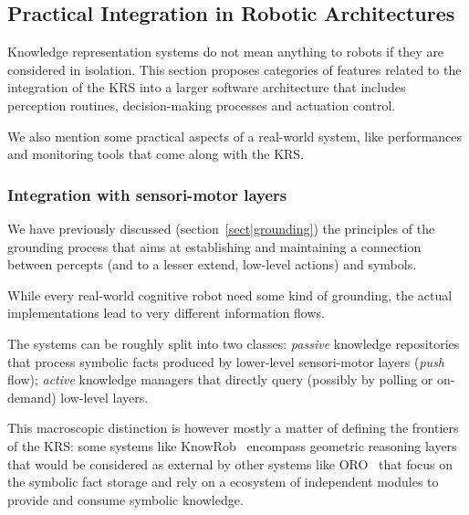 \subsection{Practical Integration in Robotic Architectures}
\label{sect|integration-robot}

\begin{scriptsize}
\begin{center}
\end{center}
\end{scriptsize}


Knowledge representation systems do not mean anything to robots if they are
considered in isolation. This section proposes categories of features related
to the integration of the KRS into a larger software architecture that includes
perception routines, decision-making processes and actuation control.

We also mention some practical aspects of a real-world system, like
performances and monitoring tools that come along with the KRS.

\subsubsection{Integration with sensori-motor layers}
\label{sect|integration-sensorimotor}

We have previously discussed (section~\ref{sect|grounding}) the principles of
the grounding process that aims at establishing and maintaining a connection
between percepts (and to a lesser extend, low-level actions) and symbols.

While every real-world cognitive robot need some kind of grounding, the actual
implementations lead to very different information flows.

The systems can be roughly split into two classes: \emph{passive} knowledge
repositories that process symbolic facts produced by lower-level sensori-motor
layers (\emph{push} flow); \emph{active} knowledge managers that directly query
(possibly by polling or on-demand) low-level layers.

This macroscopic distinction is however mostly a matter of defining the
frontiers of the KRS: some systems like KnowRob~\cite{Tenorth2009a} encompass
geometric reasoning layers that would be considered as external by other
systems like ORO~\cite{Lemaignan2010} that focus on the symbolic fact storage
and rely on a ecosystem of independent modules to provide and consume symbolic
knowledge.

